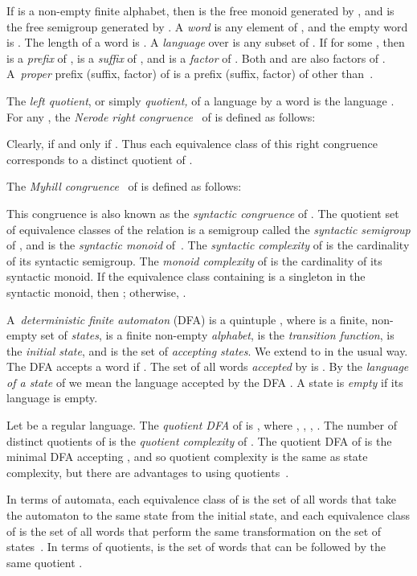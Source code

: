 \documentclass{llncs}
\begin{document}
If  is a non-empty finite alphabet, then  is the free monoid generated by , and  is the free semigroup generated by .  A \emph{word} is any element of , and the empty word is . The length of a word  is . A \emph{language} over  is any subset of . 
If  for some , then  is a {\em prefix\/} of ,  is a {\em suffix\/} of , and  is a {\em factor\/} of . Both  and  are also factors of . 
A~{\em proper} prefix (suffix, factor) of  is a prefix (suffix, factor) of  other than~. 


The \emph{left quotient}, or simply \emph{quotient,} of a language  by a word  is  the language . 
For any  , the \emph{Nerode right congruence}~\cite{Ner58}  of  is defined as follows: 

Clearly,  if and only if .
Thus each equivalence class of this right congruence corresponds to a distinct quotient of .


The \emph{Myhill congruence}~\cite{Myh57}  of  is defined as follows:

This congruence is also known as the \emph{syntactic congruence} of .
The quotient set  of equivalence classes of the relation  is a semigroup called the \emph{syntactic semigroup} of , and 
 is the \emph{syntactic monoid} of~. 
The \emph{syntactic complexity}  of  is the cardinality of its syntactic semigroup.
The \emph{monoid complexity}  of  is the cardinality of its syntactic monoid.
If the  equivalence class containing  is a singleton in the syntactic monoid, then ; otherwise, .

A~\emph{deterministic finite automaton} (DFA) is a quintuple , where 
 is a finite, non-empty set of \emph{states},  is a finite non-empty \emph{alphabet},  is the \emph{transition function},  is the \emph{initial state}, and  is the set of \emph{accepting states}. We extend  to  in the usual way.
The DFA  accepts a word  if . 
The set of all words {\it accepted} by  is . 
By the \emph{language of a state}  of  
we mean the language accepted 
by the DFA . 
A state is \emph{empty} if its language is empty.

Let  be a regular language. 
The \emph{quotient DFA} of  is 
, where , , 
,  .
The number   of distinct quotients of  is the \emph{quotient complexity} of . 
The quotient DFA of  is the minimal DFA accepting , and so quotient complexity is the same as  state complexity, but there are advantages to using quotients~\cite{Brz09}.


In terms of automata, each equivalence class  of  is the set of all words  that take the automaton to the same state from the initial state, and each equivalence class  of  is the set of all words that perform the same transformation on the set of states~\cite{McNP71}.
In terms of quotients,  is the set of words  that can be followed by the same quotient . 
\end{document}
